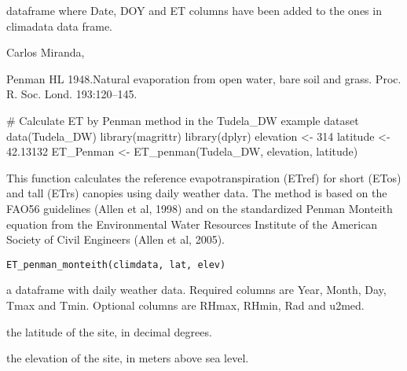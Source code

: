 \documentclass[a4paper]{book}
\begin{document}
%
\begin{Value}
dataframe where Date, DOY and ET columns have been added to the ones
in climadata data frame.
\end{Value}
%
\begin{Author}\relax
Carlos Miranda, 
\end{Author}
%
\begin{References}\relax
Penman HL 1948.Natural evaporation from open water, bare soil and grass.
Proc. R. Soc. Lond. 193:120–145.
\end{References}
%
\begin{Examples}
\begin{ExampleCode}
 # Calculate ET by Penman method in the Tudela_DW example dataset
data(Tudela_DW)
library(magrittr)
library(dplyr)
elevation <- 314
latitude <- 42.13132
ET_Penman <- ET_penman(Tudela_DW, elevation, latitude) 

\end{ExampleCode}
\end{Examples}
%
\begin{Description}\relax
This function calculates the reference evapotranspiration (ETref) for short
(ETos) and tall (ETrs) canopies using daily weather data. The method is based
on the FAO56 guidelines (Allen et al, 1998) and on the standardized Penman Monteith 
equation from the Environmental Water Resources Institute of the American 
Society of Civil Engineers (Allen et al, 2005).
\end{Description}
%
\begin{Usage}
\begin{verbatim}
ET_penman_monteith(climdata, lat, elev)
\end{verbatim}
\end{Usage}
%
\begin{Arguments}
\begin{ldescription}
\item[\code{climdata}] a dataframe with daily weather data.
Required columns are Year, Month, Day, Tmax and Tmin. Optional columns are
RHmax, RHmin, Rad and u2med.

\item[\code{lat}] the latitude of the site, in decimal degrees.

\item[\code{elev}] the elevation of the site, in meters above sea level.
\end{ldescription}
\end{Arguments}
\end{document}
